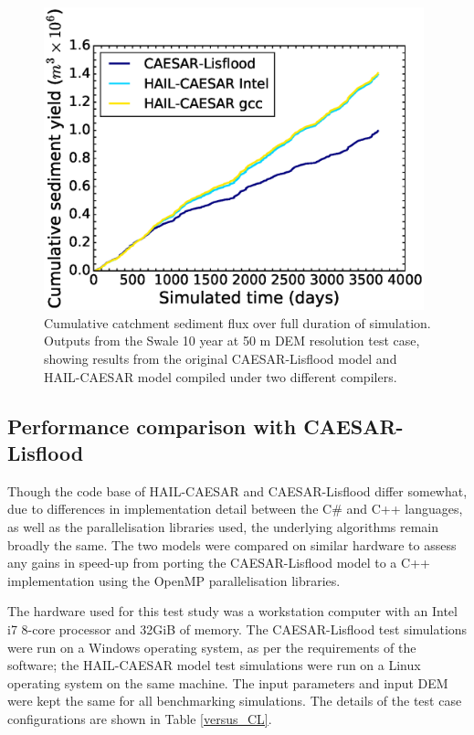 \begin{figure}[t]
\includegraphics[width=11cm]{chp05_figures_scripts/cum_sed_tot_regression.eps}
\caption{Cumulative catchment sediment flux over full duration of simulation. Outputs from the Swale 10 year at 50 m DEM resolution test case, showing results from the original CAESAR-Lisflood model and HAIL-CAESAR model compiled under two different compilers.}
\label{fig_swale_regression_cum_sediment}
\end{figure}

\subsection{Performance comparison with CAESAR-Lisflood}

Though the code base of HAIL-CAESAR and CAESAR-Lisflood differ somewhat, due to differences in implementation detail between the C\# and C++ languages, as well as the parallelisation libraries used, the underlying algorithms remain broadly the same. The two models were compared on similar hardware to assess any gains in speed-up from porting the CAESAR-Lisflood model to a C++ implementation using the OpenMP parallelisation libraries.

The hardware used for this test study was a workstation computer with an Intel i7 8-core processor and 32GiB of memory. The CAESAR-Lisflood test simulations were run on a Windows operating system, as per the requirements of the software; the HAIL-CAESAR model test simulations were run on a Linux operating system on the same machine. The input parameters and input DEM were kept the same for all benchmarking simulations. The details of the test case configurations are shown in Table \ref{versus_CL}.

